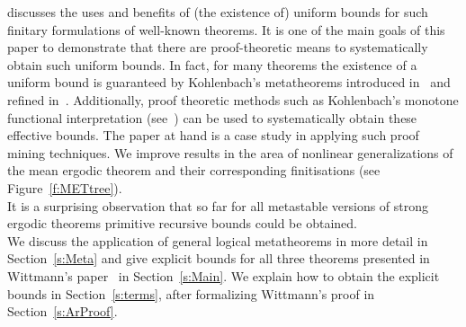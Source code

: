 discusses the uses and benefits of (the existence of) uniform bounds for such finitary formulations of well-known
theorems.
It is one of the main
goals of this paper to demonstrate that there are proof-theoretic means to systematically 
obtain such uniform bounds.
In fact, for many theorems the existence of a uniform bound is guaranteed by Kohlenbach's metatheorems
introduced in~\cite{Kohlenbach05meta} and refined in~\cite{GK08}. Additionally, 
proof theoretic methods such as Kohlenbach's monotone functional interpretation (see~\cite{Kohlenbach96mfi}) can be used to
systematically obtain these effective bounds.
The paper at hand is a case study in applying such proof mining techniques. 
We improve results in the area of nonlinear
generalizations of the mean ergodic theorem and their corresponding finitisations (see Figure~\ref{f:METtree}).\\
It is a surprising observation that so far for all metastable versions of strong ergodic theorems
primitive recursive bounds could be obtained.\\ 
We discuss the application of general logical metatheorems in more detail in Section~\ref{s:Meta} and give explicit bounds
for all three theorems presented in Wittmann's paper~\cite{Wittmann90} in Section~\ref{s:Main}.
We explain how to obtain the explicit bounds in Section~\ref{s:terms},
after formalizing Wittmann's proof in Section~\ref{s:ArProof}.
					
